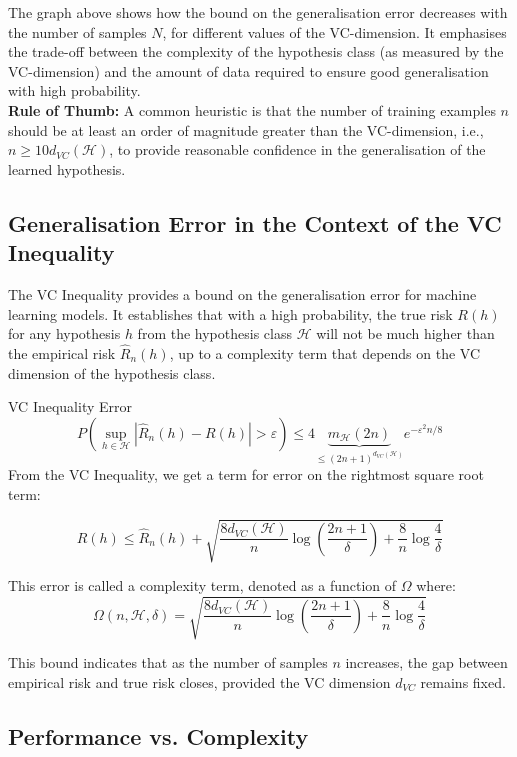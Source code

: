The graph above shows how the bound on the generalisation error decreases with the number of samples $N$, for different values of the VC-dimension. It emphasises the trade-off between the complexity of the hypothesis class (as measured by the VC-dimension) and the amount of data required to ensure good generalisation with high probability.\\

\textbf{Rule of Thumb:}
A common heuristic is that the number of training examples $n$ should be at least an order of magnitude greater than the VC-dimension, i.e., $n \geq 10d_{VC}(\mathcal{H})$, to provide reasonable confidence in the generalisation of the learned hypothesis.


\subsection{Generalisation Error in the Context of the VC Inequality}

The VC Inequality provides a bound on the generalisation error for machine learning models. It establishes that with a high probability, the true risk \(R(h)\) for any hypothesis \(h\) from the hypothesis class \(\mathcal{H}\) will not be much higher than the empirical risk \(\widehat{R}_n(h)\), up to a complexity term that depends on the VC dimension of the hypothesis class.

\begin{definitionbox}{VC Inequality Error}\label{vc_inequality_error}
\[P\left(\sup_{h\in\mathcal{H}}|\widehat{R}_{n}(h)-R(h)|>\varepsilon\right)\leqslant4\underbrace{m_{\mathcal{H}}(2n)}_{\leqslant(2n+1)^{d_{VC}(\mathcal{H})}}e^{-\varepsilon^{2}n/8}\]
From the VC Inequality, we get a term for error on the rightmost square root term:

\[
R(h) \leq \widehat{R}_n(h) + \sqrt{\frac{8d_{VC}(\mathcal{H})}{n} \log\left(\frac{2n + 1}{\delta}\right) + \frac{8}{n} \log\frac{4}{\delta}}
\]

This error is called a complexity term, denoted as a function of $\Omega$ where:
\[
\Omega(n, \mathcal{H}, \delta ) = \sqrt{\frac{8d_{VC}(\mathcal{H})}{n} \log\left(\frac{2n + 1}{\delta}\right) + \frac{8}{n} \log\frac{4}{\delta}}
\]
\end{definitionbox}

This bound indicates that as the number of samples \(n\) increases, the gap between empirical risk and true risk closes, provided the VC dimension \(d_{VC}\) remains fixed.

\subsection{Performance vs. Complexity}

